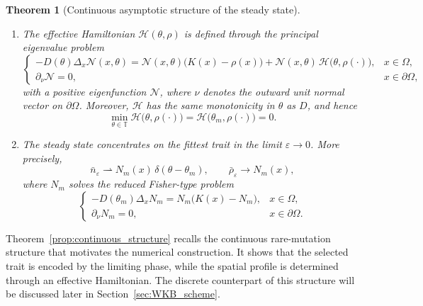 \documentclass[11pt]{article}
\newtheorem{theorem}{Theorem}[section]
\begin{document}
\begin{theorem}[Continuous asymptotic structure of the steady state]
\begin{enumerate}
\item The effective Hamiltonian \(\mathcal H(\theta,\rho)\) is defined through the principal eigenvalue problem
\begin{equation}\label{eq:eigen_N}
\begin{cases}
-D(\theta)\Delta_x \mathcal N(x,\theta)
= \mathcal N(x,\theta)\bigl(K(x)-\rho(x)\bigr)
+ \mathcal N(x,\theta)\,\mathcal H\bigl(\theta,\rho(\cdot)\bigr), & x\in\Omega,\\
\partial_\nu \mathcal N = 0, & x\in\partial\Omega,
\end{cases}
\end{equation}
with a positive eigenfunction \(\mathcal N\), where $\nu$ denotes the outward unit normal  vector on $\partial \Omega$. Moreover, \(\mathcal H\) has the same monotonicity in \(\theta\) as \(D\), and hence
\begin{equation}\label{eq:H_min_zero}
\min_{\theta\in\mathbb T} \mathcal H\bigl(\theta,\rho(\cdot)\bigr)
=
\mathcal H\bigl(\theta_m,\rho(\cdot)\bigr)
=0.
\end{equation}

\item The steady state concentrates on the fittest trait in the limit \(\varepsilon\to0\). More precisely,
\begin{equation}\label{eq:continuous_dirac_limit}
\bar n_\varepsilon \rightharpoonup N_m(x)\,\delta(\theta-\theta_m),
\qquad
\bar\rho_\varepsilon \to N_m(x),
\end{equation}
where \(N_m\) solves the reduced Fisher-type problem
\begin{equation}\label{eq:Nm_problem}
\begin{cases}
-D(\theta_m)\Delta_x N_m = N_m\bigl(K(x)-N_m\bigr), & x\in\Omega,\\
\partial_\nu N_m = 0, & x\in\partial\Omega.
\end{cases}
\end{equation}
\end{enumerate}
\end{theorem}


Theorem~\ref{prop:continuous_structure} recalls the continuous
rare-mutation structure that motivates the numerical construction.  It
shows that the selected trait is encoded by the limiting phase, while the
spatial profile is determined through an effective Hamiltonian. 
The discrete counterpart of this structure will be discussed later in Section~\ref{sec:WKB_scheme}.




\end{document}
